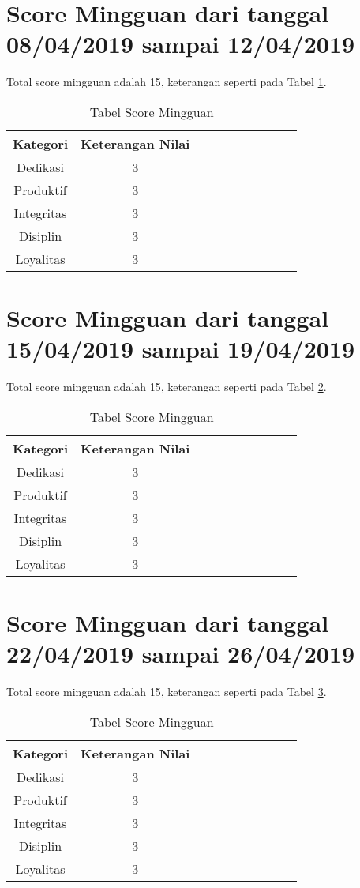 \section{Score Mingguan dari tanggal 08/04/2019 sampai 12/04/2019}
Total score mingguan adalah 15,  keterangan seperti pada Tabel \ref{table:scoremingguan7}.
\begin{table}[!ht]
\centering
\begin{tabular}{ |c|c|c|c|c|c|c|c|c|c| }
\hline
Kategori & Keterangan Nilai \\
\hline
Dedikasi & 3 \\
\hline
Produktif & 3 \\
\hline
Integritas & 3 \\
\hline
Disiplin & 3 \\
\hline
Loyalitas & 3 \\
\hline
\end{tabular}
\caption{Tabel Score Mingguan}
\label{table:scoremingguan7}
\end{table}


\section{Score Mingguan dari tanggal 15/04/2019 sampai 19/04/2019}
Total score mingguan adalah 15,  keterangan seperti pada Tabel \ref{table:scoremingguan8}.
\begin{table}[!ht]
\centering
\begin{tabular}{ |c|c|c|c|c|c|c|c|c|c| }
\hline
Kategori & Keterangan Nilai \\
\hline
Dedikasi & 3 \\
\hline
Produktif & 3 \\
\hline
Integritas & 3 \\
\hline
Disiplin & 3 \\
\hline
Loyalitas & 3 \\
\hline
\end{tabular}
\caption{Tabel Score Mingguan}
\label{table:scoremingguan8}
\end{table}


\section{Score Mingguan dari tanggal 22/04/2019 sampai 26/04/2019}
Total score mingguan adalah 15,  keterangan seperti pada Tabel \ref{table:scoremingguan9}.
\begin{table}[!ht]
\centering
\begin{tabular}{ |c|c|c|c|c|c|c|c|c|c| }
\hline
Kategori & Keterangan Nilai \\
\hline
Dedikasi & 3 \\
\hline
Produktif & 3 \\
\hline
Integritas & 3 \\
\hline
Disiplin & 3 \\
\hline
Loyalitas & 3 \\
\hline
\end{tabular}
\caption{Tabel Score Mingguan}
\label{table:scoremingguan9}
\end{table}





